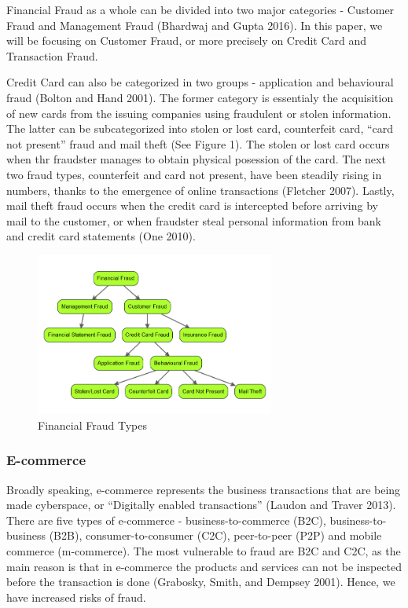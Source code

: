 \documentclass[12pt,]{article}
\begin{document}
Financial Fraud as a whole can be divided into two major categories -
Customer Fraud and Management Fraud (Bhardwaj and Gupta 2016). In this
paper, we will be focusing on Customer Fraud, or more precisely on
Credit Card and Transaction Fraud.

Credit Card can also be categorized in two groups - application and
behavioural fraud (Bolton and Hand 2001). The former category is
essentialy the acquisition of new cards from the issuing companies using
fraudulent or stolen information. The latter can be subcategorized into
stolen or lost card, counterfeit card, ``card not present'' fraud and
mail theft (See Figure 1). The stolen or lost card occurs when thr
fraudster manages to obtain physical posession of the card. The next two
fraud types, counterfeit and card not present, have been steadily rising
in numbers, thanks to the emergence of online transactions (Fletcher
2007). Lastly, mail theft fraud occurs when the credit card is
intercepted before arriving by mail to the customer, or when fraudster
steal personal information from bank and credit card statements (One
2010).

\begin{figure}
\centering
\includegraphics[width=0.7\textwidth,height=\textheight]{figures/fraud_hierarchy.png}
\caption{Financial Fraud Types}
\end{figure}

\hypertarget{e-commerce}{%
\subsubsection{E-commerce}\label{e-commerce}}

Broadly speaking, e-commerce represents the business transactions that
are being made cyberspace, or ``Digitally enabled transactions'' (Laudon
and Traver 2013). There are five types of e-commerce -
business-to-commerce (B2C), business-to-business (B2B),
consumer-to-consumer (C2C), peer-to-peer (P2P) and mobile commerce
(m-commerce). The most vulnerable to fraud are B2C and C2C, as the main
reason is that in e-commerce the products and services can not be
inspected before the transaction is done (Grabosky, Smith, and Dempsey
2001). Hence, we have increased risks of fraud.
\end{document}
